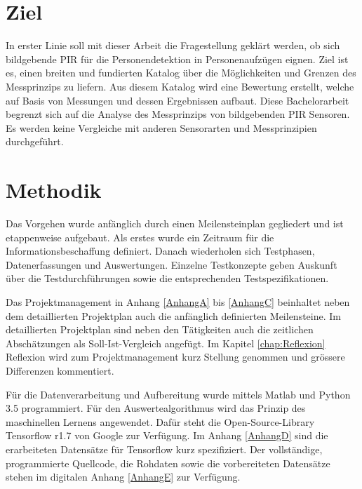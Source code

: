 \section{Ziel}
\label{sec:Einleitung}
In erster Linie soll mit dieser Arbeit die Fragestellung geklärt werden, ob sich bildgebende \ac{PIR} für die Personendetektion in Personenaufzügen eignen. Ziel ist es, einen breiten und fundierten Katalog über die Möglichkeiten und Grenzen des Messprinzips zu liefern. Aus diesem Katalog wird eine Bewertung erstellt, welche auf Basis von Messungen und dessen Ergebnissen aufbaut. Diese Bachelorarbeit begrenzt sich auf die Analyse des Messprinzips von bildgebenden \ac{PIR} Sensoren. Es werden keine Vergleiche mit anderen Sensorarten und Messprinzipien durchgeführt.

\section {Methodik}
\label{sec:Methodik}
Das Vorgehen wurde anfänglich durch einen Meilensteinplan gegliedert und ist etappenweise aufgebaut. Als erstes wurde ein Zeitraum für die Informationsbeschaffung definiert. Danach wiederholen sich Testphasen, Datenerfassungen und Auswertungen. Einzelne Testkonzepte geben Auskunft über die Testdurchführungen sowie die entsprechenden Testspezifikationen. 

Das Projektmanagement in Anhang \ref{AnhangA} bis \ref{AnhangC} beinhaltet neben dem detaillierten Projektplan auch die anfänglich definierten Meilensteine. Im detaillierten Projektplan sind neben den Tätigkeiten auch die zeitlichen Abschätzungen als Soll-Ist-Vergleich angefügt. Im Kapitel \ref{chap:Reflexion} Reflexion wird zum Projektmanagement kurz Stellung genommen und grössere Differenzen kommentiert.

Für die Datenverarbeitung und Aufbereitung wurde mittels Matlab und Python 3.5 programmiert. Für den Auswertealgorithmus wird das Prinzip des maschinellen Lernens angewendet. Dafür steht die Open-Source-Library Tensorflow r1.7 von Google zur Verfügung. Im Anhang \ref{AnhangD} sind die erarbeiteten Datensätze für Tensorflow kurz spezifiziert. Der vollständige, programmierte Quellcode, die Rohdaten sowie die vorbereiteten Datensätze stehen im digitalen Anhang \ref{AnhangE} zur Verfügung. 


